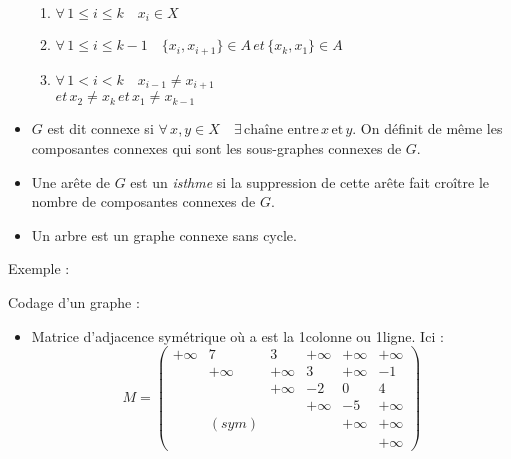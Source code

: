 \documentclass[a4paper, 8pt]{article}
\begin{document}
\begin{multicols*}{3}
\begin{itemize}
\begin{enumerate}
\item $\forall \, 1\leqslant i \leqslant k \quad  x_i \in X$
\item $\forall \, 1\leqslant i \leqslant k-1 \quad \{x_i,x_{i+1}\} \in A \,et\, \{x_k,x_{1}\} \in A$
\item $\forall \, 1< i< k \quad x_{i-1} \neq x_{i+1}$ \\$ et\, x_2 \neq x_k \,et\, x_1 \neq x_{k-1}$
\end{enumerate}
\item $G$ est dit connexe si $\forall\,x,y\in X \quad \exists\,\text{chaîne entre}\,x\,\text{et}\,y$. On définit de même les composantes connexes qui sont les sous-graphes connexes de $G$.
\item Une arête de $G$ est un \textit{isthme} si la suppression de cette arête fait croître le nombre de composantes connexes de $G$.
\item Un arbre est un graphe connexe sans cycle.
\end{itemize}

Exemple :
\begin{center}
\end{center}

Codage d'un graphe :

\begin{itemize}
	\item Matrice d'adjacence symétrique où a est la 1\iere colonne ou 1\iere ligne. Ici : \\
	 \[M = \left(\begin{smallmatrix}
	+\infty & 7 & 3 & +\infty & +\infty & +\infty \\ 
	 & +\infty & +\infty & 3 & +\infty & -1 \\ 
	 &  & +\infty & -2 & 0 & 4 \\ 
	 &  &  & +\infty & -5 & +\infty \\ 
	 & (sym) &  &  & +\infty & +\infty \\ 
	 &  &  &  &  & +\infty
	\end{smallmatrix} \right)\]
	

\end{itemize}
\end{multicols*}
\end{document}
